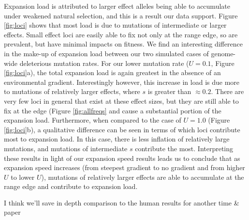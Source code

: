 Expansion load is attributed to larger effect alleles being able to accumulate under weakened natural selection, and this is a result our data support. Figure \ref{fig:loci} shows that most load is due to mutations of intermediate or larger effects. Small effect loci are easily able to fix not only at the range edge, so are prevalent, but have minimal impacts on fitness. We find an interesting difference in the make-up of expansion load between our two simulated cases of genome-wide deleterious mutation rates. For our lower mutation rate ($U = 0.1$, Figure \ref{fig:loci}a), the total expansion load is again greatest in the absence of an environmental gradient. Interestingly however, this increase in load is due more to mutations of relatively larger effects, where $s$ is greater than $\approx 0.2$. There are very few loci in general that exist at these effect sizes, but they are still able to fix at the edge (Figure \ref{fig:allfreqs} and cause a substantial portion of the expansion load. Furthermore, when compared to the case of $U = 1.0$ (Figure \ref{fig:loci}b), a qualitative difference can be seen in terms of which loci contribute most to expansion load. In this case, there is less inflation of relatively large mutations, and mutations of intermediate $s$ contribute the most. Interpreting these results in light of our expansion speed results leads us to conclude that as expansion speed increases (from steepest gradient to no gradient and from higher $U$ to lower $U$), mutations of relatively larger effects are able to accumulate at the range edge and contribute to expansion load.


\color{red}I think we'll save in depth comparison to the human results for another time \& paper \color{black}


